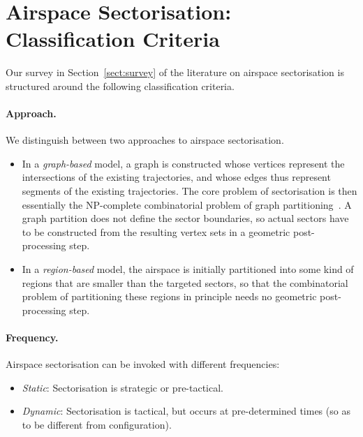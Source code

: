 \documentclass[a4paper,12pt]{article}
\begin{document}
\section{Airspace Sectorisation: Classification Criteria}
\label{sect:dim}

Our survey in Section~\ref{sect:survey} of the literature on airspace
sectorisation is structured around the following classification
criteria.

\paragraph{Approach.}
We distinguish between two approaches to airspace sectorisation.
\begin{itemize}
\item In a \emph{graph-based} model, a graph is constructed whose
  vertices represent the intersections of the existing trajectories,
  and whose edges thus represent segments of the existing
  trajectories.  The core problem of sectorisation is then essentially
  the NP-complete combinatorial problem of graph
  partitioning~\cite{GareyJohnson:NP}.  A graph partition does not
  define the sector boundaries, so actual sectors have to be
  constructed from the resulting vertex sets in a geometric
  post-processing step.
\item In a \emph{region-based} model, the airspace is initially
  partitioned into some kind of regions that are smaller than the
  targeted sectors, so that the combinatorial problem of partitioning
  these regions in principle needs no geometric post-processing step.
\end{itemize}

\paragraph{Frequency.}
Airspace sectorisation can be invoked with different frequencies:
\begin{itemize}
\item \emph{Static}: Sectorisation is strategic or pre-tactical.
\item \emph{Dynamic}: Sectorisation is tactical, but occurs at
  pre-determined times (so as to be different from configuration).
\end{itemize}
\end{document}
